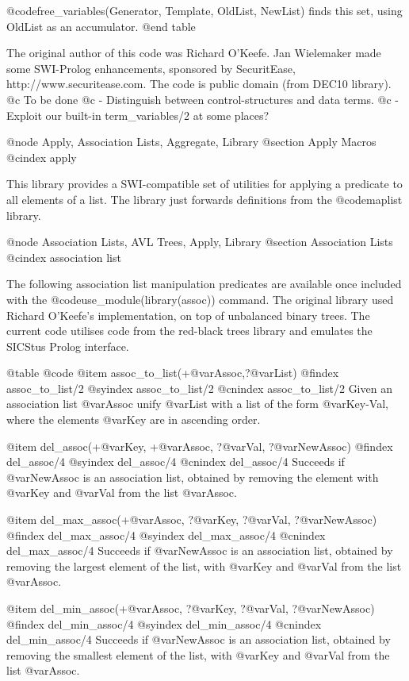 {{{{{{{{    @code{free_variables(Generator, Template, OldList, NewList)} finds this set, using OldList as an accumulator.
@end table

The original author of this code was Richard O'Keefe. Jan Wielemaker
    made some SWI-Prolog enhancements, sponsored by SecuritEase,
    http://www.securitease.com. The code is public domain (from DEC10 library).
    @c To be done
    @c     - Distinguish between control-structures and data terms.
    @c     - Exploit our built-in term_variables/2 at some places? 



@node Apply, Association Lists, Aggregate, Library
@section Apply Macros
@cindex apply

This library provides a SWI-compatible set of utilities for applying a
predicate to all elements of a list. The library just forwards
definitions from the @code{maplist} library.



@node Association Lists, AVL Trees, Apply, Library
@section Association Lists
@cindex association list

The following association list manipulation predicates are available
once included with the @code{use_module(library(assoc))} command. The
original library used Richard O'Keefe's implementation, on top of
unbalanced binary trees. The current code utilises code from the
red-black trees library and emulates the SICStus Prolog interface.

@table @code
@item assoc_to_list(+@var{Assoc},?@var{List})
@findex assoc_to_list/2
@syindex assoc_to_list/2
@cnindex assoc_to_list/2
Given an association list @var{Assoc} unify @var{List} with a list of
the form @var{Key-Val}, where the elements @var{Key} are in ascending
order.

@item del_assoc(+@var{Key}, +@var{Assoc}, ?@var{Val}, ?@var{NewAssoc})
@findex del_assoc/4
@syindex del_assoc/4
@cnindex del_assoc/4
Succeeds if @var{NewAssoc} is an association list, obtained by removing
the element with @var{Key} and @var{Val} from the list @var{Assoc}.

@item del_max_assoc(+@var{Assoc}, ?@var{Key}, ?@var{Val}, ?@var{NewAssoc})
@findex del_max_assoc/4
@syindex del_max_assoc/4
@cnindex del_max_assoc/4
Succeeds if @var{NewAssoc} is an association list, obtained by removing
the largest element of the list, with @var{Key} and @var{Val} from the
list @var{Assoc}.

@item del_min_assoc(+@var{Assoc}, ?@var{Key}, ?@var{Val}, ?@var{NewAssoc})
@findex del_min_assoc/4
@syindex del_min_assoc/4
@cnindex del_min_assoc/4
Succeeds if @var{NewAssoc} is an association list, obtained by removing
the smallest element of the list, with @var{Key} and @var{Val}
from the list @var{Assoc}.

}}}}}}}}
